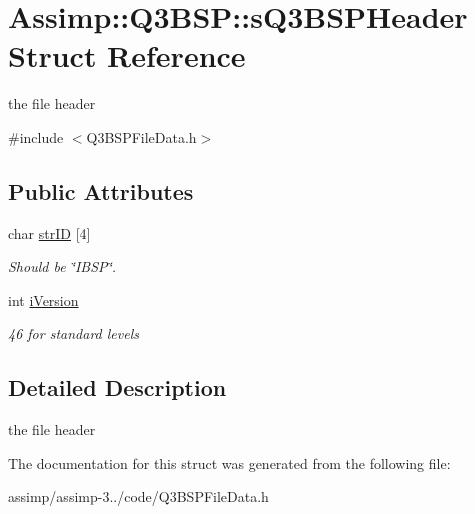 \hypertarget{struct_assimp_1_1_q3_b_s_p_1_1s_q3_b_s_p_header}{\section{Assimp\+:\+:Q3\+B\+S\+P\+:\+:s\+Q3\+B\+S\+P\+Header Struct Reference}
\label{struct_assimp_1_1_q3_b_s_p_1_1s_q3_b_s_p_header}
}


the file header  




{\ttfamily \#include $<$Q3\+B\+S\+P\+File\+Data.\+h$>$}

\subsection*{Public Attributes}
\begin{DoxyCompactItemize}
\item 
\hypertarget{struct_assimp_1_1_q3_b_s_p_1_1s_q3_b_s_p_header_ac3306385373d8517c987f69c37d99689}{char \hyperlink{struct_assimp_1_1_q3_b_s_p_1_1s_q3_b_s_p_header_ac3306385373d8517c987f69c37d99689}{str\+I\+D} \mbox{[}4\mbox{]}}\label{struct_assimp_1_1_q3_b_s_p_1_1s_q3_b_s_p_header_ac3306385373d8517c987f69c37d99689}

\begin{DoxyCompactList}\small\item\em Should be \char`\"{}\+I\+B\+S\+P\char`\"{}. \end{DoxyCompactList}\item 
\hypertarget{struct_assimp_1_1_q3_b_s_p_1_1s_q3_b_s_p_header_a1ff9dd9b6ec21267833e5dccb2ed3ab4}{int \hyperlink{struct_assimp_1_1_q3_b_s_p_1_1s_q3_b_s_p_header_a1ff9dd9b6ec21267833e5dccb2ed3ab4}{i\+Version}}\label{struct_assimp_1_1_q3_b_s_p_1_1s_q3_b_s_p_header_a1ff9dd9b6ec21267833e5dccb2ed3ab4}

\begin{DoxyCompactList}\small\item\em 46 for standard levels \end{DoxyCompactList}\end{DoxyCompactItemize}


\subsection{Detailed Description}
the file header 

The documentation for this struct was generated from the following file\+:\begin{DoxyCompactItemize}
\item 
assimp/assimp-\/3../code/Q3\+B\+S\+P\+File\+Data.\+h\end{DoxyCompactItemize}
